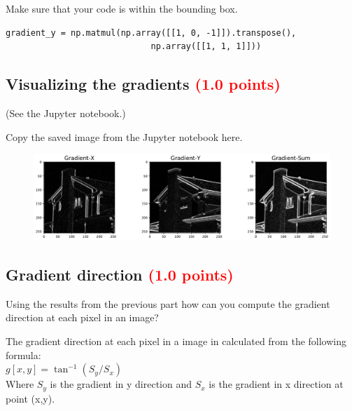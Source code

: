 \documentclass[answers]{exam}
\newcommand{\mypoints}[1]{\textcolor{red}{(#1 points)}}
\begin{document}
Make sure that your code is within the bounding box.
\begin{solution}
\begin{verbatim}
gradient_y = np.matmul(np.array([[1, 0, -1]]).transpose(),
                             np.array([[1, 1, 1]]))
\end{verbatim}
\end{solution}

\subsection{Visualizing the gradients \mypoints{1.0}}
(See the Jupyter notebook.)

Copy the saved image from the Jupyter notebook here.
\begin{solution}
\begin{figure}[H]
    \centering
    \includegraphics[width=1.0\linewidth]{Images/question_4_3.pdf}
\end{figure}
\end{solution}

\subsection{Gradient direction \mypoints{1.0}}
Using the results from the previous part how can you compute the gradient direction at each pixel in an image?

\begin{solution}
The gradient direction at each pixel in a image in calculated from the following formula:\\
$g[x,y] = \tan^{-1}(S_y/S_x)$\\
Where $S_y$ is the gradient in y direction and $S_x$ is the gradient in x direction at point (x,y).

\end{solution}
\end{document}
